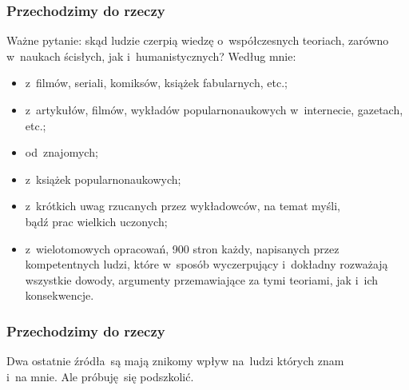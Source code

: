 \documentclass[10pt,t]{beamer}
\begin{document}
\begin{frame}
  \frametitle{Przechodzimy do rzeczy}

  Ważne pytanie: skąd ludzie czerpią wiedzę o~współczesnych teoriach,
  zarówno w~naukach ścisłych, jak i~humanistycznych? Według mnie:
  \begin{itemize}
    \RaggedRight

  \item z~filmów, seriali, komiksów, książek fabularnych, etc.;

  \item z~artykułów, filmów, wykładów popularnonaukowych
    w~internecie, gazetach, etc.;

  \item od~znajomych;

  \item z~książek popularnonaukowych;

  \item z~krótkich uwag rzucanych przez wykładowców, na temat myśli, \\
    bądź prac wielkich uczonych;

  \item z~wielotomowych opracowań, 900 stron każdy, napisanych
    przez kompetentnych ludzi, które w~sposób wyczerpujący
    i~dokładny rozważają wszystkie dowody, argumenty przemawiające
    za tymi teoriami, jak i~ich konsekwencje.

  \end{itemize}

\end{frame}





\begin{frame}
  \frametitle{Przechodzimy do rzeczy}


  Dwa ostatnie źródła~są mają znikomy wpływ na~ludzi których znam \\
  i~na mnie. Ale próbuję~się podszkolić.

\end{frame}
\end{document}
